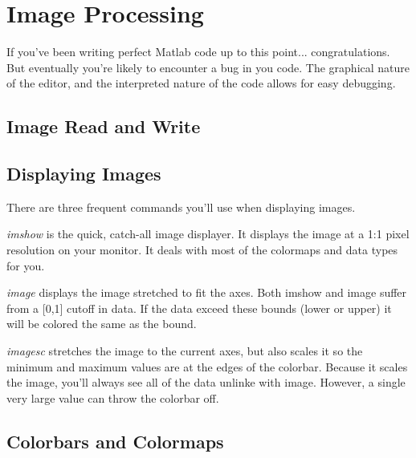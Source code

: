 
\pagebreak
\section{Image Processing}
If you've been writing perfect Matlab code up to this point... congratulations.
 But eventually you're likely to encounter a bug in you code.
 The graphical nature of the editor, and the interpreted nature of the code allows for easy debugging.

\subsection{Image Read and Write}

\begin{quote}

\end{quote}

\pagebreak
\subsection{Displaying Images}
There are three frequent commands you'll use when displaying images.

\emph{imshow} is the quick, catch-all image displayer.
 It displays the image at a 1:1 pixel resolution on your monitor.
 It deals with most of the colormaps and data types for you.

\emph{image} displays the image stretched to fit the axes.
 Both imshow and image suffer from a [0,1] cutoff in data.
 If the data exceed these bounds (lower or upper) it will be colored the same as the bound.

\emph{imagesc} stretches the image to the current axes, but also scales it so the minimum and maximum values are at the edges of the colorbar.
 Because it scales the image, you'll always see all of the data unlinke with image.
 However, a single very large value can throw the colorbar off.

\begin{quote}
 
\end{quote}

\pagebreak
\subsection{Colorbars and Colormaps}


\begin{quote}
 
\end{quote}
